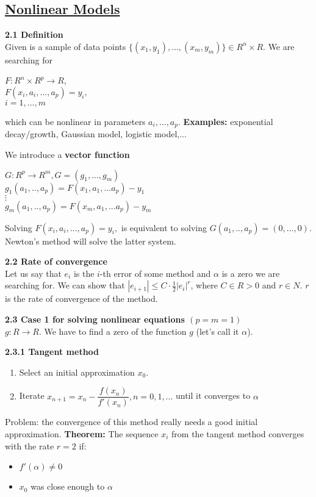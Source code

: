 \documentclass{article}
\begin{document}
\begin{multicols}{2}
	\section{\underline{Nonlinear Models}}

	\textbf{2.1 Definition}\\
	Given is a sample of data points $\{(x_1, y_1), \dots ,(x_m, y_m)\} \in R^n \times R$.
	We are searching for
	\begin{center}
		$F: R^n \times R^p \rightarrow R$, \\
		$F(x_i, a_i, ..., a_p) = y_i,$ \\
		$i = 1,...,m$
	\end{center}
	which can be nonlinear in parameters $a_i, \dots ,a_p$.
	\textbf{Examples:} exponential decay/growth, Gaussian model, logistic model,...

	We introduce a \textbf{vector function}
	\begin{center}
		$G: R^p \rightarrow R^m, G = (g_1,...,g_m)$\\
		$g_1(a_1,..,a_p) = F(x_1,a_1,...a_p) - y_1$\\
		$\vdots$\\
		$g_m(a_1,..,a_p) = F(x_m,a_1,...a_p) - y_m$
	\end{center}

	Solving $F(x_i, a_i, ..., a_p) = y_i,$ is equivalent to solving $G(a_1,..,a_p) = (0,...,0)$.
	Newton's method will solve the latter system.

	\textbf{2.2 Rate of convergence}\\
	Let us say that $e_i$ is the $i$-th error of some method and $\alpha$ is
	a zero we are searching for. We can show that $|e_{i+1}| \leq C \cdot \frac{1}{2}|e_i|^r$, where $C \in R>0$ and $r \in N$. $r$ is
	the rate of convergence of the method.

	\textbf{2.3 Case 1 for solving nonlinear equations  $(p = m = 1)$}\\
	$g: R \rightarrow R$. We have to find a zero of the function $g$ (let's call it $\alpha$).

	\textbf{2.3.1 Tangent method}
	\begin{enumerate}
		\item Select an initial approximation $x_0$.
		\item Iterate $x_{n+1} = x_n - \dfrac{f(x_n)}{f'(x_n)}, n=0,1,...$ until it converges to $\alpha$
	\end{enumerate}
	Problem: the convergence of this method really needs a good initial approximation.
	\textbf{Theorem:} The sequence $x_i$ from the tangent method converges with the rate
	$r = 2$ if:
	\begin{itemize}
		\item $f'(\alpha) \neq 0$
		\item $x_0$ was close enough to $\alpha$
	\end{itemize}


\end{multicols}
\end{document}
